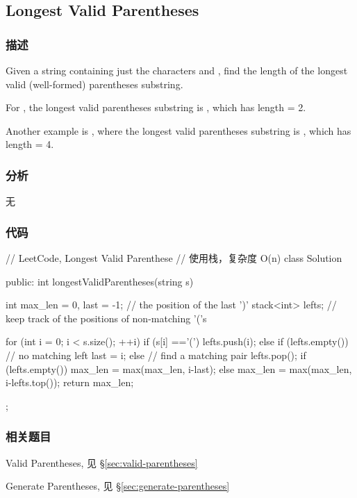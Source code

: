\subsection{Longest Valid Parentheses} %
\label{sec:longest-valid-parentheses}


\subsubsection{描述}
Given a string containing just the characters  and , find the length of the longest valid (well-formed) parentheses substring.

For , the longest valid parentheses substring is , which has length = 2.

Another example is , where the longest valid parentheses substring is , which has length = 4.


\subsubsection{分析}
无


\subsubsection{代码}
\begin{Code}
// LeetCode, Longest Valid Parenthese
// 使用栈，复杂度 O(n)
class Solution {
public:
    int longestValidParentheses(string s) {
        int max_len = 0, last = -1; // the position of the last ')'
        stack<int> lefts;  // keep track of the positions of non-matching '('s

        for (int i = 0; i < s.size(); ++i) {
            if (s[i] =='(') {
                lefts.push(i);
            } else {
                if (lefts.empty()) {
                    // no matching left
                    last = i;
                } else {
                    // find a matching pair
                    lefts.pop();
                    if (lefts.empty()) {
                        max_len = max(max_len, i-last);
                    } else {
                        max_len = max(max_len, i-lefts.top());
                    }
                }
            }
        }
        return max_len;
    }
};
\end{Code}


\subsubsection{相关题目}
\begindot
\item Valid Parentheses, 见 \S \ref{sec:valid-parentheses}
\item Generate Parentheses, 见 \S \ref{sec:generate-parentheses}
\myenddot


